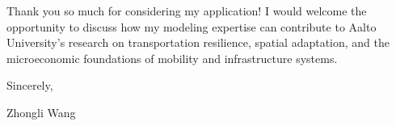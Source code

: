 \documentclass{nfr}
\begin{document}
Thank you so much for considering my application! 
I would welcome the opportunity to discuss how my modeling expertise can contribute to Aalto University’s research on transportation resilience, spatial adaptation, and the microeconomic foundations of mobility and infrastructure systems.
\vspace{5mm}

\noindent Sincerely,\\
\vspace{5mm}

\noindent Zhongli Wang





\end{document}
